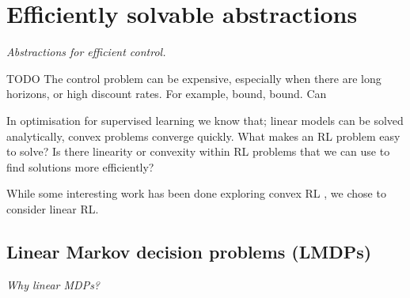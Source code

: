 \newpage
\section{Efficiently solvable abstractions}\label{solveable-abstractions}

\begin{displayquote}
  \textit{Abstractions for efficient control.}
\end{displayquote}

{\color{red}TODO}
The control problem can be expensive, especially when there are long horizons, or high discount rates.
For example, bound, bound. Can

In optimisation for supervised learning we know that;
linear models can be solved analytically,
convex problems converge quickly.
What makes an RL problem easy to solve? Is there linearity or convexity
within RL problems that we can use to find solutions more efficiently?


While some interesting work has been done exploring convex RL \cite{ODonoghue2012a, Barratt2019},
we chose to consider linear RL.

\subsection{Linear Markov decision problems (LMDPs)}

\begin{displayquote}
\textit{Why linear MDPs?}
\end{displayquote}


%


